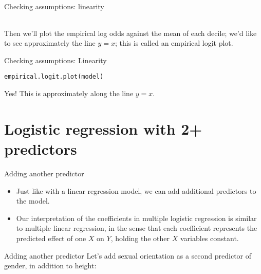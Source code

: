 \documentclass{beamer}\usepackage[]{graphicx}\usepackage[]{color}
\makeatletter
\newcommand{\hlstd}[1]{\textcolor[rgb]{1,0.894,0.769}{#1}}%
\newcommand{\hlkwd}[1]{\textcolor[rgb]{1,0.78,0.769}{#1}}%
\newenvironment{kframe}{%
 \def\at@end@of@kframe{}%
 \ifinner\ifhmode%
  \def\at@end@of@kframe{\end{minipage}}%
  \begin{minipage}{\columnwidth}%
 \fi\fi%
 \def\FrameCommand##1{\hskip\@totalleftmargin \hskip-\fboxsep
 \colorbox{shadecolor}{##1}\hskip-\fboxsep
     \hskip-\linewidth \hskip-\@totalleftmargin \hskip\columnwidth}%
 \MakeFramed {\advance\hsize-\width
   \@totalleftmargin\z@ \linewidth\hsize
   \@setminipage}}%
 {\par\unskip\endMakeFramed%
 \at@end@of@kframe}
\newenvironment{knitrout}{}{} %
\makeatother
\begin{document}
\begin{darkframes}
\begin{frame}{Checking assumptions: linearity}
\begin{center}
\begin{tabular}{lllll}
        \end{tabular}
      \end{center}

      Then we'll plot the empirical log odds against the mean of each decile; we'd like to see approximately the line $y=x$; this is called an \alert{empirical logit plot}.
    \end{frame}

    \begin{frame}[fragile]{Checking assumptions: Linearity}
\begin{knitrout}
\begin{kframe}
\begin{alltt}
\hlkwd{empirical.logit.plot}\hlstd{(model)}
\end{alltt}
\end{kframe}


\end{knitrout}
      \pause\vspace{-0.5cm}
      \greencheckmark \alert{Yes!} This is approximately along the line $y=x$.
    \end{frame}

    \section{Logistic regression with 2+ predictors}

    \begin{frame}{Adding another predictor}
      \begin{itemize}
        \item Just like with a linear regression model, we can add additional predictors to the model.
        \item Our interpretation of the coefficients in multiple logistic regression is similar to multiple linear regression, in the sense that each coefficient represents the predicted effect of one $X$ on $Y$, holding the other $X$ variables constant.
      \end{itemize}
    \end{frame}

    \begin{frame}[fragile]{Adding another predictor}
      Let's add sexual orientation as a second predictor of gender, in addition to height:
      

\end{frame}
\end{darkframes}
\end{document}
